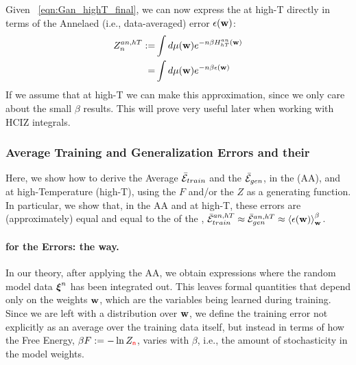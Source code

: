 Given \EQN~\ref{eqn:Gan_highT_final}, we can now express the \Annealed \PartitionFunction at high-T directly in terms of
the Annelaed (i.e., data-averaged) error $\epsilon({\mathbf{w}})$:
\begin{align}
  \nonumber
  \label{eqn:Zanht_def}
Z^{an,hT}_{n} :=  &\int d\mu({\mathbf{w}}) e^{-n\beta H^{an}_{hT}({\mathbf{w}})} \\ 
  =  &\int d\mu({\mathbf{w}}) e^{-n\beta\epsilon({\mathbf{w}})} 
\end{align}
If we assume that at high-T we can make this approximation, 
since we only care about the small $\beta$ results. 
This will prove very useful later when working with HCIZ integrals.


\subsubsection{Average Training and Generalization Errors and their \GeneratingFunctions}
\label{sxn:mathP_errors}


Here, we show how to derive the Average \TrainingError $\bar{\mathcal{E}}_{train}$ and  the \AverageGeneralizationError $\bar{\mathcal{E}}_{gen}$,
in the \AnnealedApproximation (AA), and at high-Temperature (high-T), using the \FreeEnergy $F$ and/or the \PartitionFunction $Z$ as
a generating function.  
In particular, we show that, in the AA and at high-T, these errors are (approximately) equal
and equal to the \ThermalAverage of the \EffectivePotential,
$\bar{\mathcal{E}}_{train}^{an, hT} \approx \bar{\mathcal{E}}_{gen}^{an, hT} \approx \left\langle \epsilon({\mathbf{w}}) \right\rangle_{\mathbf w}^{\beta}$.


\paragraph{\GeneratingFunctions for the Errors: the \STATMECH way.}
In our theory, after applying the AA, we obtain expressions where the random model data $\boldsymbol{\xi}^{n}$ has been integrated out. This leaves formal quantities that depend only on the weights ${\mathbf{w}}$, which are the variables being learned during training.
Since we are left with a distribution over ${\mathbf{w}}$, we define the training error not explicitly as an average over the training data itself, but instead in terms of how the Free Energy, $\beta F :=-\ln Z_{{\color{red}\sf{n}}}$, varies with $\beta$, i.e., the amount of stochasticity in the model weights.

